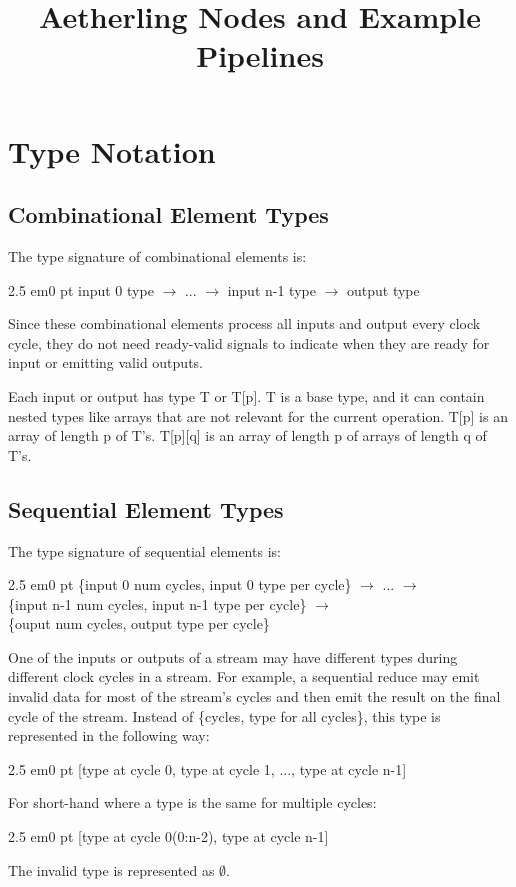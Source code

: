 \documentclass[11pt,fleqn]{article}
\numberwithin{equation}{subsection}
\begin{document}
\title{Aetherling Nodes and Example Pipelines}

\section{Type Notation}

\subsection{Combinational Element Types}
The type signature of combinational elements is:
\begin{adjustwidth}{2.5 em}{0 pt}
    input 0 type $\rightarrow$ ... $\rightarrow$ input n-1 type $\rightarrow$ output type
\end{adjustwidth}
Since these combinational elements process all inputs and output every 
clock cycle, they do not need ready-valid signals to indicate when they are
ready for input or emitting valid outputs.

Each input or output has type T or T[p]. T is a base type, and it can contain 
nested types like arrays that are not relevant for the current operation. T[p] 
is an array of length p of T's. T[p][q] is an array of length p of arrays of 
length q of T's.

\subsection{Sequential Element Types}
The type signature of sequential elements is:
\begin{adjustwidth}{2.5 em}{0 pt}
    \{input 0 num cycles, input 0 type per cycle\} $\rightarrow$ ...
    $\rightarrow$ \\
    \{input n-1 num cycles, input n-1 type per cycle\} $\rightarrow$ \\ 
    \{ouput num cycles, output type per cycle\}
\end{adjustwidth}

One of the inputs or outputs of a stream may have different types during different
clock cycles in a stream. For example, a sequential reduce may emit invalid 
data for most of the stream's cycles and then emit the result on the final
cycle of the stream. Instead of \{cycles, type for all cycles\}, 
this type is represented in the following way:
\begin{adjustwidth}{2.5 em}{0 pt}
    [type at cycle 0, type at cycle 1, ..., type at cycle n-1]
\end{adjustwidth}
For short-hand where a type is the same for multiple cycles:
\begin{adjustwidth}{2.5 em}{0 pt}
    [type at cycle 0(0:n-2), type at cycle n-1]
\end{adjustwidth}
The invalid type is represented as $\emptyset$.
\end{document}
